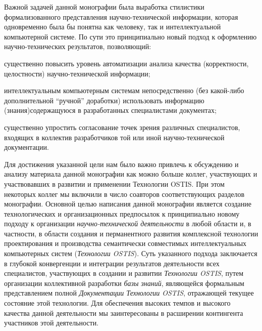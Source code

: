 \begin{SCn}
{Важной задачей данной  монографии   была выработка стилистики формализованного представления научно-технической информации, которая одновременно была бы понятна как человеку, так и интеллектуальной компьютерной системе. По сути это принципиально новый подход к оформлению научно-технических результатов, позволяющий:
\begin{scnitemize}
 \item существенно повысить уровень автоматизации анализа качества (корректности, целостности) научно-технической информации;
 \item интеллектуальным компьютерным системам непосредственно (без какой-либо дополнительной “ручной” доработки) использовать информацию (знания)содержащуюся в разработанных специалистами документах;
 \item существенно упростить согласование точек зрения различных специалистов, входящих в коллектив разработчиков той или  иной научно-технической документации.
\end{scnitemize}
Для достижения указанной цели нам было важно привлечь к обсуждению и анализу материала данной монографии как можно больше коллег, участвующих и участвовавших в развитии и применении Технологии OSTIS. При этом некоторых коллег мы включили в число соавторов соответствующих разделов монографии.
Основной целью написания данной монографии является создание технологических и организационных предпосылок к принципиально новому  подходу к организации \textit{научно-технической деятельности} в любой области и, в частности, в области создания и перманентного развития комплексной технологии проектирования и производства семантически совместимых интеллектуальных компьютерных систем (\textit{Технологии OSTIS}). Суть указанного подхода заключается  в глубокой конвергенции и интеграции результатов деятельности всех специалистов, участвующих в создании и развитии \textit{Технологии OSTIS}, путем организации коллективной разработки \textit{базы знаний}, являющейся формальным представлением полной \textit{Документации Технологии OSTIS}, отражающей текущее состояние этой технологии. Для обеспечения высоких темпов и высокого качества данной деятельности мы заинтересованы в расширении контингента участников этой деятельности.

}
\end{SCn}
